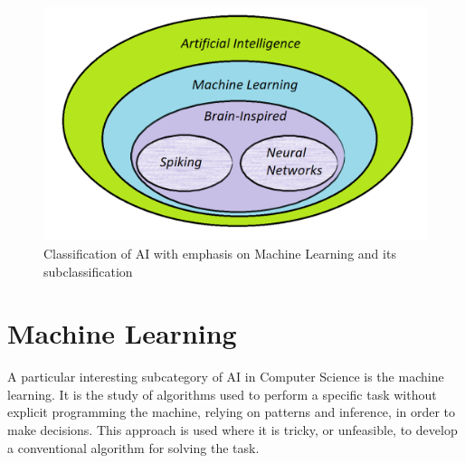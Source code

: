 \begin{figure}[H]
\centering
\captionsetup{justification=centering}
\includegraphics[scale=0.5]{./figure/ai_division.PNG}
\caption{Classification of AI with emphasis on Machine Learning and its subclassification}
\label{fig:aidiv}
\end{figure}

\section{Machine Learning}
A particular interesting subcategory of AI in Computer Science is the machine learning. It is the study of algorithms used to perform a specific task without explicit programming the machine, relying on patterns and inference, in order to make decisions. This approach is used where it is tricky, or unfeasible, to develop a conventional algorithm for solving the task.\\

